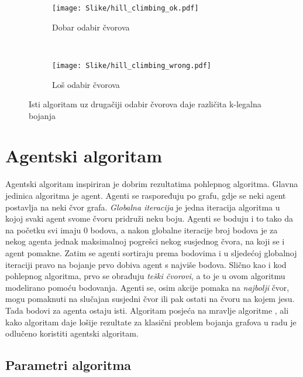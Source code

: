 \documentclass[times, utf8, diplomski, numeric]{fer}
\begin{document}
\begin{figure}
        \centering
        \begin{subfigure}[b]{0.4\textwidth}
                \texttt{[image: Slike/hill\_climbing\_ok.pdf]}
                \caption{Dobar odabir čvorova}
                \label{fig:hill_climbing_ok}
        \end{subfigure}
        ~
        \begin{subfigure}[b]{0.4\textwidth}
                \texttt{[image: Slike/hill\_climbing\_wrong.pdf]}
                \caption{Loš odabir čvorova}
                \label{fig:hill_climbing_wrong}
        \end{subfigure}
        \caption{Isti algoritam uz drugačiji odabir čvorova daje različita k-legalna bojanja}
        \label{fig:hill_climbing}
\end{figure}



\section{Agentski algoritam}

Agentski algoritam inspiriran je dobrim rezultatima pohlepnog algoritma. Glavna jedinica algoritma je agent. Agenti se raspoređuju po grafu, gdje se neki agent postavlja na neki čvor grafa. \emph{Globalna iteracija} je jedna iteracija algoritma u kojoj svaki agent svome čvoru pridruži neku boju. Agenti se boduju i to tako da na početku svi imaju $0$ bodova, a nakon globalne iteracije broj bodova je za nekog agenta jednak maksimalnoj pogrešci nekog susjednog čvora, na koji se i agent pomakne. Zatim se agenti sortiraju prema bodovima i u sljedećoj globalnoj iteraciji pravo na bojanje prvo dobiva agent s najviše bodova. Slično kao i kod pohlepnog algoritma, prvo se obrađuju \emph{teški čvorovi}, a to je u ovom algoritmu modelirano pomoću bodovanja. Agenti se, osim akcije pomaka na \emph{najbolji} čvor, mogu pomaknuti na slučajan susjedni čvor ili pak ostati na čvoru na kojem jesu. Tada bodovi za agenta ostaju isti. Algoritam posjeća na mravlje algoritme  \cite{lit3}, ali kako algoritam daje lošije rezultate za klasični problem bojanja grafova u radu je odlučeno koristiti agentski algoritam.

\subsection{Parametri algoritma}
\end{document}
